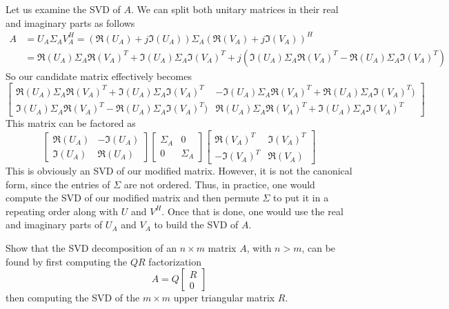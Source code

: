 \documentclass{homework}
\begin{document}
\begin{solution}
  Let us examine the SVD of $A$. We can split both unitary matrices in their real and imaginary parts as follows
  \[ 
    \begin{aligned}
      A &= U_A \Sigma_A V^H_A = (\Re(U_A) + j\Im(U_A))\Sigma_A(\Re(V_A) + j\Im(V_A))^H \\
        &= \Re(U_A)\Sigma_A\Re(V_A)^T + \Im(U_A)\Sigma_A\Im(V_A)^T + j(\Im(U_A)\Sigma_A\Re(V_A)^T - \Re(U_A)\Sigma_A\Im(V_A)^T)
    \end{aligned}
  \]
  So our candidate matrix effectively becomes
  \[
    \begin{bmatrix}
      \Re(U_A)\Sigma_A\Re(V_A)^T + \Im(U_A)\Sigma_A\Im(V_A)^T & - \Im(U_A)\Sigma_A\Re(V_A)^T + \Re(U_A)\Sigma_A\Im(V_A)^T) \\
      \Im(U_A)\Sigma_A\Re(V_A)^T - \Re(U_A)\Sigma_A\Im(V_A)^T) &\Re(U_A)\Sigma_A\Re(V_A)^T + \Im(U_A)\Sigma_A\Im(V_A)^T 
    \end{bmatrix}
  \]
  This matrix can be factored as
  \[
    \begin{bmatrix}
      \Re(U_A) & -\Im(U_A) \\
      \Im(U_A) & \Re(U_A)
    \end{bmatrix}
    \begin{bmatrix}
      \Sigma_A & 0 \\
      0 & \Sigma_A
    \end{bmatrix}
    \begin{bmatrix}
      \Re(V_A)^T & \Im(V_A)^T \\
      -\Im(V_A)^T & \Re(V_A)
    \end{bmatrix}
  \]
  This is obviously an SVD of our modified matrix. However, it is not the canonical form, since the entries of $\Sigma$ are not ordered. Thus, in practice, one would compute the SVD of our modified matrix and then permute $\Sigma$ to put it in a repeating order along with $U$ and $V^H$. Once that is done, one would use the real and imaginary parts of $U_A$ and $V_A$ to build the SVD of $A$.
\end{solution}

\begin{problem}[7-18]
  Show that the SVD decomposition of an $n \times m$ matrix $A$, with $n > m$, can be found by first computing the $QR$ factorization
  \[
    A = Q
    \begin{bmatrix}
      R \\
      0
    \end{bmatrix}
  \]
  then computing the SVD of the $m \times m$ upper triangular matrix $R$.
\end{problem}
\end{document}

